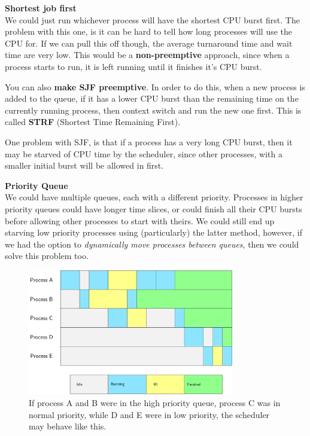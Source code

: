 \begin{description}
  \item \textbf{Shortest job first}\\
    We could just run whichever process will have the shortest CPU burst first.
    The problem with this one, is it can be hard to tell how long processes will
    use the CPU for. If we can pull this off though, the average turnaround time
    and wait time are very low. This would be a \textbf{non-preemptive}
    approach, since when a process starts to run, it is left running until it
    finishes it's CPU burst.

    You can also \textbf{make SJF preemptive}. In order to do this, when a new
    process is added to the queue, if it has a lower CPU burst than the
    remaining time on the currently running process, then context switch and run
    the new one first. This is called \textbf{STRF} (Shortest Time Remaining
    First).

    One problem with SJF, is that if a process has a very long CPU burst, then
    it may be starved of CPU time by the scheduler, since other processes, with
    a smaller initial burst will be allowed in first.

  \item \textbf{Priority Queue}\\
    We could have multiple queues, each with a different priority. Processes in
    higher priority queues could have longer time slices, or could finish all
    their CPU bursts before allowing other processes to start with theirs. We
    could still end up starving low priority processes using (particularly) the
    latter method, however, if we had the option to \textit{dynamically move
    processes between queues}, then we could solve this problem too.


    \begin{figure}[ht!]
      \centering
      \includegraphics[width=90mm]{diagrams/priority.pdf}
      \caption{If process A and B were in the high priority queue, process C was
      in normal priority, while D and E were in low priority, the scheduler may
      behave like this.}
      \label{priority}
    \end{figure}


\end{description}
